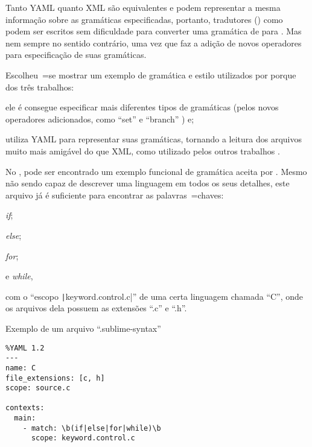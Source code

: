 Tanto YAML quanto XML são equivalentes e
podem representar a mesma informação sobre as gramáticas especificadas,
portanto,
tradutores () como  podem ser escritos sem dificuldade para converter uma gramática de  para .
Mas nem sempre no sentido contrário,
uma vez que  faz a adição de novos operadores para especificação de suas gramáticas.

Escolheu~=se mostrar um exemplo de gramática e
estilo utilizados por  porque dos três trabalhos:
\begin{inparaenum}[1)]
\item ele é consegue especificar mais diferentes tipos de gramáticas (pelos novos operadores adicionados,
como ``set'' e
``branch'' \cite{branchTemporarilyHighlightsWrong}) e;
\item utiliza YAML para representar suas gramáticas,
tornando a leitura dos arquivos muito mais amigável do que XML,
como utilizado pelos outros trabalhos \cite{textMateEditor,vsCodeSyntaxHighlighthing}.
\end{inparaenum}%
No ,
pode ser encontrado um exemplo funcional de gramática aceita por .
Mesmo não sendo capaz de descrever uma linguagem em todos os seus detalhes,
este arquivo já é suficiente para encontrar as palavras~=chaves:
\begin{inparaenum}[1)]
\item \textit{if};
\item \textit{else};
\item \textit{for};
\item e
\textit{while},
\end{inparaenum}%
com o ``escopo \texttt|keyword.control.c|'' de uma certa linguagem chamada ``C'',
onde os arquivos dela possuem as extensões ``.c'' e
``.h''.
\begin{code}
\caption{Exemplo de um arquivo ``.sublime-syntax''}
\label{exemploDeUmArquivoSublimeSyntax}
\begin{verbatim}
%YAML 1.2
---
name: C
file_extensions: [c, h]
scope: source.c

contexts:
  main:
    - match: \b(if|else|for|while)\b
      scope: keyword.control.c
\end{verbatim}
\xpretocmd{\ABNTEXfontereduzida}{\setlength{\belowcaptionskip}{-13pt}}{}{}
\vspace{13pt}
\end{code}

